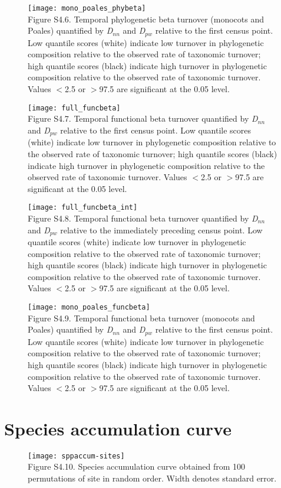 \begin{figure}[H]
\centering
\texttt{[image: mono\_poales\_phybeta]}\\
\footnotesize Figure S4.6. Temporal phylogenetic beta turnover (monocots and Poales) quantified by \textit{D}$_{nn}$ and \textit{D}$_{pw}$ relative to the first census point. Low quantile scores (white) indicate low turnover in phylogenetic composition relative to the observed rate of taxonomic turnover; high quantile scores (black) indicate high turnover in phylogenetic composition relative to the observed rate of taxonomic turnover. Values $<$2.5 or $>$97.5 are significant at the 0.05 level.
\end{figure}


\begin{figure}[H]
\centering
\texttt{[image: full\_funcbeta]}\\
\footnotesize Figure S4.7. Temporal functional beta turnover quantified by \textit{D}$_{nn}$ and  \textit{D}$_{pw}$ relative to the first census point. Low quantile scores (white) indicate low turnover in phylogenetic composition relative to the observed rate of taxonomic turnover; high quantile scores (black) indicate high turnover in phylogenetic composition relative to the observed rate of taxonomic turnover. Values $<$2.5 or $>$97.5 are significant at the 0.05 level.
\end{figure}



\begin{figure}[H]
\centering
\texttt{[image: full\_funcbeta\_int]}\\
\footnotesize Figure S4.8. Temporal functional beta turnover quantified by \textit{D}$_{nn}$ and  \textit{D}$_{pw}$ relative to the immediately preceding census point. Low quantile scores (white) indicate low turnover in phylogenetic composition relative to the observed rate of taxonomic turnover; high quantile scores (black) indicate high turnover in phylogenetic composition relative to the observed rate of taxonomic turnover. Values $<$2.5 or $>$97.5 are significant at the 0.05 level.
\end{figure}

\begin{figure}[H]
\centering
\texttt{[image: mono\_poales\_funcbeta]}\\
\footnotesize Figure S4.9. Temporal functional beta turnover (monocots and Poales) quantified by \textit{D}$_{nn}$ and \textit{D}$_{pw}$ relative to the first census point. Low quantile scores (white) indicate low turnover in phylogenetic composition relative to the observed rate of taxonomic turnover; high quantile scores (black) indicate high turnover in phylogenetic composition relative to the observed rate of taxonomic turnover. Values $<$2.5 or $>$97.5 are significant at the 0.05 level.
\end{figure}

\section{Species accumulation curve}

\begin{figure}[H]
\centering
\texttt{[image: sppaccum-sites]}\\
\footnotesize Figure S4.10. Species accumulation curve obtained from 100 permutations of site in random order. Width denotes standard error.
\end{figure}

